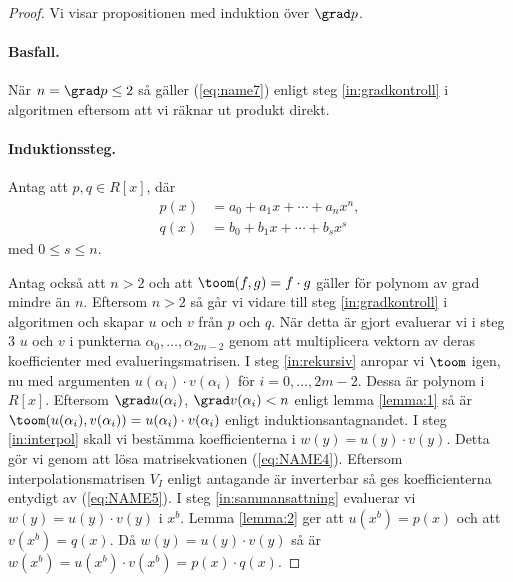 \begin{proof}
Vi visar propositionen med induktion över $\grad p$.

\paragraph{Basfall.}
När $n = \grad p \leq 2$ så gäller (\ref{eq:name7}) enligt steg
\ref{in:gradkontroll} i algoritmen eftersom att vi räknar ut produkt direkt.

\paragraph{Induktionssteg.}
\label{in:induktion}
Antag att $p, q \in R[x]$, där
\begin{align*}
  p(x) &= a_0 + a_1 x + \cdots + a_n x^n, \\
  q(x) &= b_0 + b_1 x + \cdots + b_s x^s
\end{align*}
med $0 \leq s \leq n$.

\bigskip\noindent
Antag också att $n > 2$ och att $\toom (f, g) =  f \cdot g$ gäller för polynom
av grad mindre än $n$. Eftersom $n > 2$ så går vi vidare till steg
\ref{in:gradkontroll} i algoritmen och skapar $u$ och $v$ från $p$ och $q$. När
detta är gjort evaluerar vi i steg 3 $u$ och $v$ i punkterna $\alpha_0, \dots,
\alpha_{2m-2}$ genom att multiplicera vektorn av deras koefficienter med
evalueringsmatrisen. I steg \ref{in:rekursiv} anropar vi $\toom$ igen, nu med
argumenten $u(\alpha_i) \cdot v(\alpha_i)$ för $i = 0, \ldots , 2m-2$. Dessa är
polynom i $R[x]$. Eftersom $\grad u(\alpha_i)$, $\grad v(\alpha_i) < n$ enligt
lemma \ref{lemma:1} så är $\toom (u(\alpha_i), v(\alpha_i)) = u(\alpha_i) \cdot
v(\alpha_i)$ enligt induktionsantagnandet. I steg \ref{in:interpol} skall vi
bestämma koefficienterna i $w(y)=u(y) \cdot v(y)$. Detta gör vi genom att lösa
matrisekvationen (\ref{eq:NAME4}). Eftersom interpolationsmatrisen $V_I$ enligt
antagande är inverterbar så ges koefficienterna entydigt av (\ref{eq:NAME5}). I
steg \ref{in:sammansattning} evaluerar vi $w(y)=u(y) \cdot v(y)$ i $x^b$. Lemma
\ref{lemma:2} ger att $u(x^b)=p(x)$ och att $v(x^b)=q(x)$. Då $w(y)=u(y) \cdot
v(y)$ så är $w(x^b)=u(x^b) \cdot v(x^b)=p(x) \cdot q(x)$.
\end{proof}

